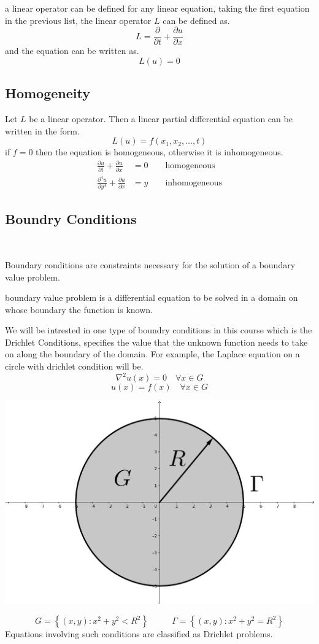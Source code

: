 \documentclass[]{article}
\begin{document}
a linear operator can be defined for any linear equation, taking the first equation in the previous list, the linear operator $L$ can be defined as.
\[
L = \frac{\partial }{\partial t} + \frac{\partial u}{\partial x}
\]
and the equation can be written as.
\[
    L(u)=0    
\]

\subsection{Homogeneity}
Let $L$ be a linear operator. Then a linear partial differential equation can be written in the form.
\[
    L(u) = f(x_1,x_2, \dots , t)    
\]
if $f = 0$ then the equation is homogeneous, otherwise it is inhomogeneous.
\begin{align*}
\frac{\partial u}{\partial t} + \frac{\partial u}{\partial x} &= 0 \quad\quad \text{homogeneous}
\\
\frac{\partial^4 u}{\partial y^4} + \frac{\partial u}{\partial x} &= y \quad\quad \text{inhomogeneous}
\end{align*}

\newpage

\subsection{Boundry Conditions}
\ \ 
\begin{definition}{Boundary conditions}
    are constraints necessary for the solution of a boundary value problem.
\end{definition}
\begin{definition}
    boundary value problem is a differential equation to be solved in a domain on whose boundary the function is known.
\end{definition}
We will be intrested in one type of boundry conditions in this course which is the Drichlet Conditions, specifies the value that the unknown function needs to take on along the boundary of the domain. For example, the Laplace equation on a circle with drichlet condition will be.
\[
    \nabla^2 u(x) = 0 \quad \forall x \in G    
\]
\[
    u(x) = f(x) \quad \forall x \in G    
\]
\begin{center}
\includegraphics[scale=0.1]{laplacecircle.png} 
\end{center}
\[
    G = \left\lbrace (x,y):x^2+y^2 < R^2 \right\rbrace  \;\;\;\;\;\;\;\;\;\ \Gamma = \left\lbrace (x,y):x^2+y^2 = R^2 \right\rbrace    
\]
Equations involving such conditions are classified as Drichlet problems.
\end{document}
